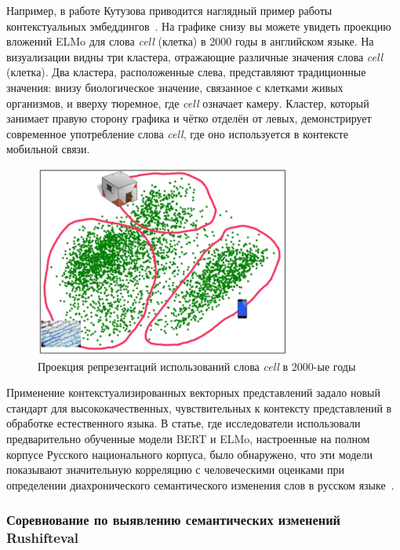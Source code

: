 \documentclass[LI,VKR]{HSEUniversity}
\begin{document}
Например, в работе Кутузова приводится наглядный пример работы
контекстуальных эмбеддингов~\cite{Kutuzov2020Thesis}.
На графике снизу вы можете увидеть проекцию вложений ELMo для слова \textit{cell} (клетка)
в 2000 годы в английском языке.
На визуализации видны три кластера, отражающие различные значения слова \textit{cell} (клетка).
Два кластера, расположенные слева, представляют традиционные значения:
внизу биологическое значение, связанное с клетками живых организмов,
и вверху тюремное, где \textit{cell} означает камеру.
Кластер, который занимает правую сторону графика и чётко отделён от левых,
демонстрирует современное употребление слова \textit{cell},
где оно используется в контексте мобильной связи.

\begin{figure}[H]
	\centering
	\includegraphics[width=0.75\textwidth]{img/theory/cell_projection_2000}
	\caption{Проекция репрезентаций использований слова \textit{cell} в 2000-ые годы}
	\label{fig:Контекстуальные вложения}
\end{figure}

Применение контекстуализированных векторных представлений задало новый стандарт для
высококачественных, чувствительных к контексту представлений в обработке естественного языка.
В статье, где исследователи использовали предварительно обученные модели BERT и ELMo,
настроенные на полном корпусе Русского национального корпуса, было обнаружено,
что эти модели показывают значительную корреляцию с человеческими оценками
при определении диахронического семантического изменения слов в русском языке~\cite{rodina2020elmo}.

\subsubsection{Соревнование по выявлению семантических изменений Rushifteval}
\end{document}

